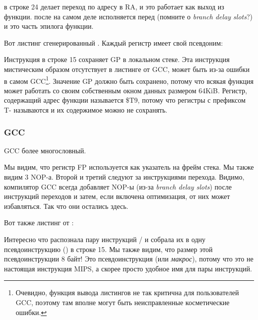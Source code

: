  в строке 24 делает переход по адресу в \ac{RA}, и это работает как выход из функции.
 после  на самом деле исполняется перед  (помните о \emph{branch delay slots}?) 
и это часть эпилога функции.

Вот листинг сгенерированный \IDA. Каждый регистр имеет свой псевдоним:



Инструкция в строке 15 сохраняет GP в локальном стеке. Эта инструкция мистическим образом отсутствует
в листинге от GCC, может быть из-за ошибки в самом GCC\footnote{Очевидно, функция вывода листингов не так критична
для пользователей GCC, поэтому там вполне могут быть неисправленные косметические ошибки.}.
Значение GP должно быть сохранено, потому что всякая функция может работать со своим собственным окном данных
размером 64KiB.
Регистр, содержащий адрес функции \puts называется \$T9, потому что регистры с префиксом T- называются
 и их содержимое можно не сохранять.

\subsubsection{\NonOptimizing GCC}

\NonOptimizing GCC более многословный.



Мы видим, что регистр FP используется как указатель на фрейм стека.
Мы также видим 3 \ac{NOP}-а.
Второй и третий следуют за инструкциями перехода.
Видимо, компилятор GCC всегда добавляет \ac{NOP}-ы (из-за \emph{branch delay slots})
после инструкций переходов и затем, если включена оптимизация, от них может избавляться.
Так что они остались здесь.

Вот также листинг от \IDA:



Интересно что \IDA распознала пару инструкций / и собрала их в одну псевдоинструкцию 
 () в строке 15.
Мы также видим, что размер этой псевдоинструкции 8 байт!
Это псевдоинструкция (или \emph{макрос}), потому что это не настоящая инструкция MIPS, а скорее
просто удобное имя для пары инструкций.

